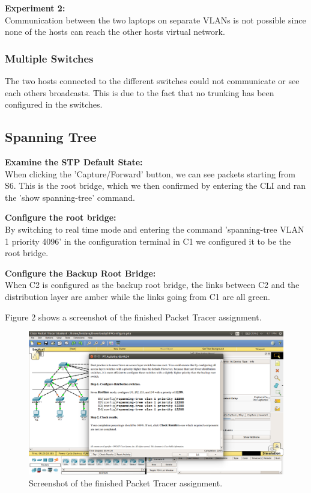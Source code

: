 \documentclass[11pt,parskip=half]{scrartcl}
\begin{document}
\textbf{Experiment 2:}\\
Communication between the two laptops on separate VLANs is not possible
since none of the hosts can reach the other hosts virtual network.

\subsubsection{Multiple Switches}
The two hosts connected to the different switches could not communicate or
see each others broadcasts. This is due to the fact that no trunking has
been configured in the switches.

\subsection{Spanning Tree}
\textbf{Examine the STP Default State:}\\
When clicking the 'Capture/Forward' button, we can see packets
starting from S6. This is the root bridge, which we then
confirmed by entering the CLI and ran the 'show spanning-tree'
command.

\textbf{Configure the root bridge:}\\
By switching to real time mode and entering the command
'spanning-tree VLAN 1 priority 4096' in the configuration
terminal in C1 we configured it to be the root bridge.

\textbf{Configure the Backup Root Bridge:}\\
When C2 is configured as the backup root bridge, the links
between C2 and the distribution layer are amber while the links
going from C1 are all green.

Figure 2 shows a screenshot of the finished Packet Tracer assignment.
\begin{figure}[!ht]
	\includegraphics[width=1\textwidth]{configure-pt}
    \caption{Screenshot of the finished Packet Tracer assignment.}
\end{figure}
\end{document}
